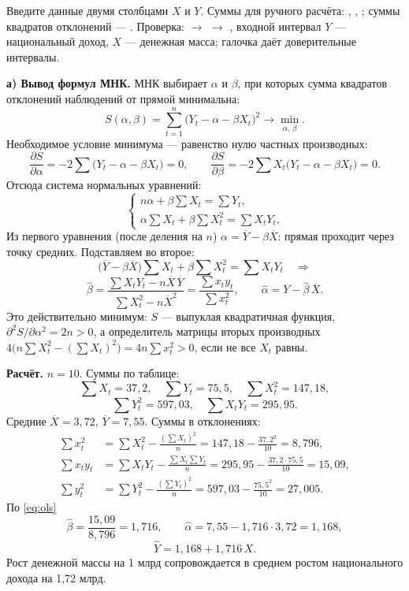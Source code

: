 \begin{excel}
Введите данные двумя столбцами $X$ и $Y$. Суммы для ручного расчёта:
, , ; суммы
квадратов отклонений — . Проверка:  $\to$
 $\to$ , входной интервал $Y$ — национальный
доход, $X$ — денежная масса; галочка  даёт
доверительные интервалы.
\end{excel}

\begin{solution}
\textbf{а) Вывод формул МНК.} МНК выбирает $\alpha$ и $\beta$, при которых
сумма квадратов отклонений наблюдений от прямой минимальна:
\[
  S(\alpha, \beta) = \sum_{t=1}^{n}\bigl(Y_t - \alpha - \beta X_t\bigr)^2 \to \min_{\alpha,\,\beta}.
\]
Необходимое условие минимума — равенство нулю частных производных:
\[
  \frac{\partial S}{\partial\alpha} = -2\sum\bigl(Y_t - \alpha - \beta X_t\bigr) = 0,
  \qquad
  \frac{\partial S}{\partial\beta} = -2\sum X_t\bigl(Y_t - \alpha - \beta X_t\bigr) = 0 .
\]
Отсюда система нормальных уравнений:
\[
  \begin{cases}
    n\alpha + \beta\sum X_t = \sum Y_t, \\[2pt]
    \alpha\sum X_t + \beta\sum X_t^2 = \sum X_tY_t .
  \end{cases}
\]
Из первого уравнения (после деления на $n$) $\alpha = \overline{Y} -
\beta\overline{X}$: прямая проходит через точку средних. Подставляем во второе:
\[
  \bigl(\overline{Y} - \beta\overline{X}\bigr)\sum X_t + \beta\sum X_t^2 = \sum X_tY_t
  \quad\Longrightarrow
\]
\[
  \widehat{\beta} = \frac{\sum X_tY_t - n\overline{X}\,\overline{Y}}{\sum X_t^2 - n\overline{X}^2}
                  = \frac{\sum x_ty_t}{\sum x_t^2},
  \qquad
  \widehat{\alpha} = \overline{Y} - \widehat{\beta}\,\overline{X}.
\]
Это действительно минимум: $S$ — выпуклая квадратичная функция,
$\partial^2S/\partial\alpha^2 = 2n > 0$, а определитель матрицы вторых
производных $4\bigl(n\sum X_t^2 - (\sum X_t)^2\bigr) = 4n\sum x_t^2 > 0$, если
не все $X_t$ равны.

\medskip
\textbf{Расчёт.} $n = 10$. Суммы по таблице:
\[
  \sum X_t = 37{,}2,\quad \sum Y_t = 75{,}5,\quad \sum X_t^2 = 147{,}18,
\]
\[
  \sum Y_t^2 = 597{,}03,\quad \sum X_tY_t = 295{,}95 .
\]
Средние $\overline{X} = 3{,}72$, $\overline{Y} = 7{,}55$. Суммы в отклонениях:
\[
\begin{aligned}
  \sum x_t^2  &= \sum X_t^2 - \frac{(\sum X_t)^2}{n} = 147{,}18 - \frac{37{,}2^2}{10} = 8{,}796, \\
  \sum x_ty_t &= \sum X_tY_t - \frac{\sum X_t\sum Y_t}{n} = 295{,}95 - \frac{37{,}2\cdot 75{,}5}{10} = 15{,}09, \\
  \sum y_t^2  &= \sum Y_t^2 - \frac{(\sum Y_t)^2}{n} = 597{,}03 - \frac{75{,}5^2}{10} = 27{,}005 .
\end{aligned}
\]
По \eqref{eq:ols}
\[
  \widehat{\beta} = \frac{15{,}09}{8{,}796} = 1{,}716,
  \qquad
  \widehat{\alpha} = 7{,}55 - 1{,}716\cdot 3{,}72 = 1{,}168,
\]
\[
  \widehat{Y} = 1{,}168 + 1{,}716\,X .
\]
Рост денежной массы на 1 млрд сопровождается в среднем ростом национального
дохода на 1,72 млрд.


\end{solution}
